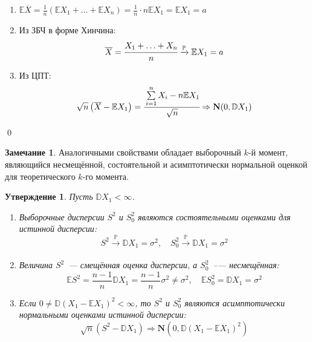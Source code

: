 \documentclass[oneside,final,14pt]{extreport}
\renewenvironment{proof}{{\bfseries Доказательство.}}{\qed}
\theoremstyle{plain}
\newtheorem*{thm*}{Утверждение}
\theoremstyle{definition}
\newtheorem*{rmrk}{Замечание}
\theoremstyle{named}
\begin{document}
\begin{proof}
\begin{enumerate}[label={\arabic*.}]
    \item $\mathbb{E} \overline{X}=\frac{1}{n}(\mathbb{E} X_{1}+\ldots+\mathbb{E} X_{n})=\frac{1}{n} \cdot n \mathbb{E} X_{1}=\mathbb{E} X_{1}=a$
    \item Из ЗБЧ в форме Хинчина:
    \begin{equation*}
        \overline{X}
        = \cfrac{X_{1}+\ldots+X_{n}}{n} \xrightarrow[]{\mathbb{P}} \mathbb{E} X_{1} 
        = a
    \end{equation*}

    \item Из ЦПТ:
    \begin{equation*}
        \sqrt{n}\left(\overline{X}-\mathbb{E} X_{1}\right) 
        = \cfrac{\sum\limits_{i=1}^{n} X_{i}-n \mathbb{E} X_{1}}{\sqrt{n}} 
        \Rightarrow \mathbf{N}(0, \mathbb{D} X_{1})
    \end{equation*}
\end{enumerate}
\end{proof}

\begin{rmrk}
    Аналогичными свойствами обладает выборочный $k$-й момент, являющийся несмещённой, состоятельной и асимптотически нормальной оценкой для теоретического $k$-го момента.
\end{rmrk}

\begin{thm*}
Пусть $\mathbb{D} X_{1}<\infty$.
\begin{enumerate}
    \item Выборочные дисперсии $S^{2}$ и $S^{2}_0$ являются состоятельными оценками для истинной дисперсии:
    \begin{equation*}
        S^{2} \xrightarrow[]{\mathbb{P}} \mathbb{D} X_{1}=\sigma^{2}, \quad S_{0}^{2} \xrightarrow[]{\mathbb{P}} \mathbb{D} X_{1}=\sigma^{2}
    \end{equation*}
    \item Величина $S^{2}$~--- смещённая оценка дисперсии, а $S^{2}_0$~--— несмещённая:
    \begin{equation*}
        \mathbb{E} S^{2}=\frac{n-1}{n} \mathbb{D} X_{1}=\frac{n-1}{n} \sigma^{2} \neq \sigma^{2}, \quad \mathbb{E} S_{0}^{2}=\mathbb{D} X_{1}=\sigma^{2}
    \end{equation*}
    
    \item Если $0 \neq \mathbb{D}(X_{1}-\mathbb{E}X_{1})^{2}<\infty$, то $S^{2}$ и $S^{2}_0$ являются асимптотически нормальными оценками истинной дисперсии:
    \begin{equation*}
        \sqrt{n}\left(S^{2}-\mathbb{D} X_{1}\right) \Rightarrow \mathbf{N}(0, \mathbb{D}(X_{1}-\mathbb{E} X_{1})^{2})
    \end{equation*}
\end{enumerate}
\end{thm*}
\end{document}
